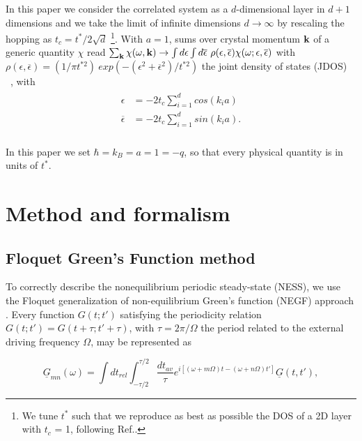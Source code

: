 \documentclass[aps,prb,groupedaddress,showpacs,twocolumn,superscriptaddress,10pt]{revtex4-2}
\begin{document}
In this paper we consider the correlated system as a $d$-dimensional layer in $d+1$ dimensions and we take the limit of infinite dimensions $d \rightarrow \infty$ by rescaling the hopping as $t_{c}=t^{*}/2\sqrt{d}$ \footnote{We tune $t^*$ such that we reproduce as best as possible the DOS of a 2D layer with $t_c$ = 1, following Ref.\cite{so.do.18}.}. With $a=1$, sums over crystal momentum ${\bf k}$ of a generic quantity $\chi$ read $\sum_{{\bf k}} \chi(\omega,{\bf k}) \rightarrow \int d\epsilon \int   d\overline{\epsilon} \ \rho(\epsilon,\overline{\epsilon}) \chi(\omega;\epsilon,\overline{\epsilon})$ with $\rho(\epsilon,\overline{\epsilon}) = (1/\pi t^{* 2}) \ exp(-( \epsilon^{2} + \overline{\epsilon}^{2})/t^{* 2})$ the joint density of states (JDOS) ~\cite{ts.ok.08}, with  
\begin{align}\label{eq:d-dim_crystal_dep}
\begin{split}  
\epsilon & = -2t_{c} \sum_{i=1}^{d} cos(k_i a) \\  
\overline{\epsilon}& = -2t_{c}\sum_{i=1}^{d} sin(k_i a). \\
\end{split}  
\end{align}   
 
In this paper we set $\hbar = k_B = a = 1 = -q$, so that every physical quantity is in units of $t^{*}$.
	  
\section{Method and formalism}    
\label{sec:Method_formalism}  

\subsection{Floquet Green's Function method}   
\label{sec:GFs_Dyson_Floquet}
 
 
	 
To correctly describe the nonequilibrium periodic steady-state (NESS), we use the Floquet generalization of non-equilibrium Green's function (NEGF) approach \cite{ts.ok.08}. Every function $G(t;t{'})$ satisfying the periodicity relation $G(t;t{'})=G(t+\tau;t{'}+\tau)$, with $\tau=2\pi/\Omega$ the period related to the external driving frequency $\Omega$, may be represented as \cite{ts.ok.08,sc.mo.02u,jo.fr.08}

\begin{equation}
\label{eq:FloquetGF} 
\underline{G}_{mn}(\omega) =\int dt_{rel} \int_{-\tau/2}^{\tau/2} \frac{dt_{av}}{\tau} e^{i[\left(\omega+m\Omega\right) t -\left( \omega+n\Omega\right)t{'}]} \underline{G}(t,t'),
\end{equation}
\end{document}
